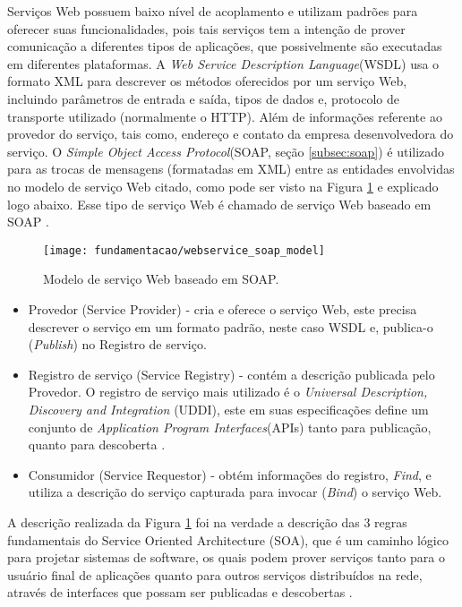 Serviços Web possuem baixo nível de acoplamento e utilizam padrões para oferecer suas funcionalidades, pois tais serviços tem a intenção de prover comunicação a diferentes tipos de aplicações, que possivelmente são executadas em diferentes plataformas. A \textit{Web Service Description Language}(WSDL) usa o formato XML para descrever os métodos oferecidos por um serviço Web, incluindo parâmetros de entrada e saída, tipos de dados e, protocolo de transporte utilizado (normalmente o HTTP). Além de informações referente ao provedor do serviço, tais como, endereço e contato da empresa desenvolvedora do serviço. O \textit{Simple Object Access Protocol}(SOAP, seção \ref{subsec:soap}) é utilizado para as trocas de mensagens (formatadas em XML) entre as entidades envolvidas no modelo de serviço Web citado\cite{Dustdar:2005}, como pode ser visto na Figura \ref{fig:wsmodelsoap} e explicado logo abaixo. Esse tipo de serviço Web é chamado de serviço Web baseado em SOAP \cite{Belqasmi:2011}.

\begin{figure}[!htb] \centering 
  \centering
  \texttt{[image: fundamentacao/webservice\_soap\_model]} 
  \caption{Modelo de serviço Web baseado em SOAP. \cite{Belqasmi:2011}} 
  \label{fig:wsmodelsoap}
\end{figure}

\begin{itemize}
\item Provedor (Service Provider) - cria e oferece o serviço Web, este precisa descrever o serviço em um formato padrão, neste caso WSDL e, publica-o (\textit{Publish}) no Registro de serviço.
\item Registro de serviço (Service Registry) - contém a descrição publicada pelo Provedor. O registro de serviço mais utilizado é o \textit{Universal Description, Discovery and Integration} (UDDI), este em suas especificações define um conjunto de \textit{Application Program Interfaces}(APIs) tanto para publicação, quanto para descoberta \cite{Belqasmi:2011}.
\item Consumidor (Service Requestor) - obtém informações do registro, \textit{Find}, e utiliza a descrição do serviço capturada para invocar (\textit{Bind}) o serviço Web.
\end{itemize}

A descrição realizada da Figura \ref{fig:wsmodelsoap} foi na verdade a descrição das 3 regras fundamentais do Service Oriented Architecture (SOA), que é um caminho lógico para projetar sistemas de software, os quais podem prover serviços tanto para o usuário final de aplicações quanto para outros serviços distribuídos na rede, através de interfaces que possam ser publicadas e descobertas \cite{Papazoglou:2008}.

